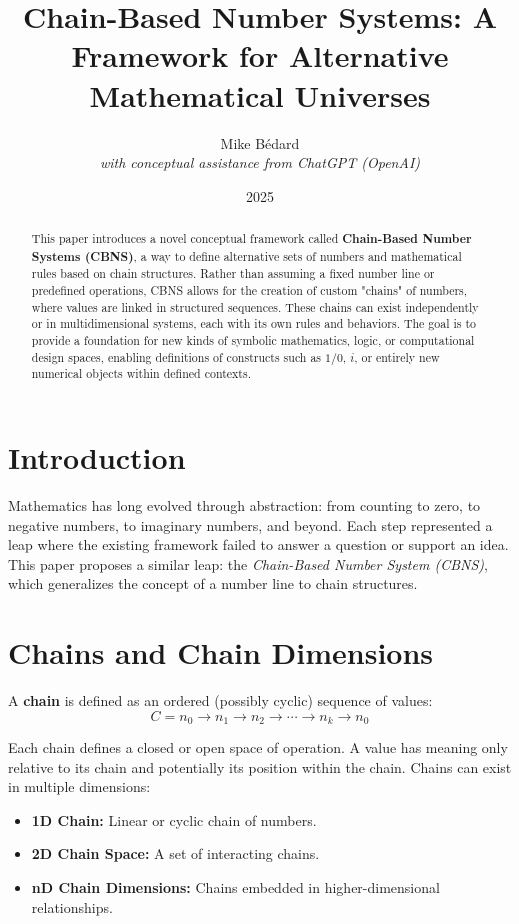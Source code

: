 \documentclass{article}
\title{Chain-Based Number Systems: A Framework for Alternative Mathematical Universes}
\author{Mike Bédard\\ \textit{with conceptual assistance from ChatGPT (OpenAI)}}
\date{2025}
\begin{document}
\maketitle

\begin{abstract}
This paper introduces a novel conceptual framework called \textbf{Chain-Based Number Systems (CBNS)}, a way to define alternative sets of numbers and mathematical rules based on chain structures. Rather than assuming a fixed number line or predefined operations, CBNS allows for the creation of custom "chains" of numbers, where values are linked in structured sequences. These chains can exist independently or in multidimensional systems, each with its own rules and behaviors. The goal is to provide a foundation for new kinds of symbolic mathematics, logic, or computational design spaces, enabling definitions of constructs such as $1/0$, $i$, or entirely new numerical objects within defined contexts.
\end{abstract}

\section{Introduction}
Mathematics has long evolved through abstraction: from counting to zero, to negative numbers, to imaginary numbers, and beyond. Each step represented a leap where the existing framework failed to answer a question or support an idea. This paper proposes a similar leap: the \textit{Chain-Based Number System (CBNS)}, which generalizes the concept of a number line to chain structures.

\section{Chains and Chain Dimensions}
A \textbf{chain} is defined as an ordered (possibly cyclic) sequence of values:
\begin{equation*}
C = n_0 \rightarrow n_1 \rightarrow n_2 \rightarrow \cdots \rightarrow n_k \rightarrow n_0
\end{equation*}

Each chain defines a closed or open space of operation. A value has meaning only relative to its chain and potentially its position within the chain. Chains can exist in multiple dimensions:
\begin{itemize}
    \item \textbf{1D Chain:} Linear or cyclic chain of numbers.
    \item \textbf{2D Chain Space:} A set of interacting chains.
    \item \textbf{nD Chain Dimensions:} Chains embedded in higher-dimensional relationships.
\end{itemize}
\end{document}
